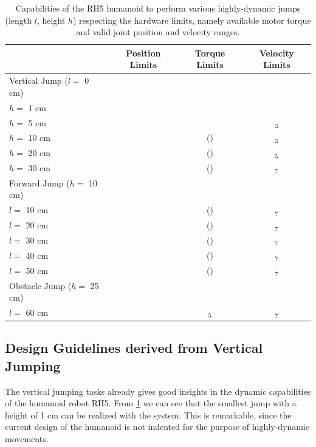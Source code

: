 \begin{table}[t]
\centering
\caption{Capabilities of the RH5 humanoid to perform various highly-dynamic jumps (length $l$, height $h$) respecting the hardware limits, namely available motor torque and valid joint position and velocity ranges.}
\begin{tabular}{lccc}
\hline
& Position Limits & Torque Limits & Velocity Limits\\ \hline
Vertical Jump ($l=$ 0 cm) & & & \\
\quad\quad $h=$ 1 cm 		& \greencheckmark  & \greencheckmark & \greencheckmark \\
\quad\quad $h=$ 5 cm 		& \greencheckmark  & \greencheckmark & \redxmark$_3$ \\
\quad\quad $h=$ 10 cm 		& \greencheckmark & (\greencheckmark) & \redxmark$_3$  \\
\quad\quad $h=$ 20 cm 		& \greencheckmark  & (\greencheckmark) & \redxmark$_5$ \\
\quad\quad $h=$ 30 cm 		& \greencheckmark  & (\greencheckmark) & \redxmark$_7$ \\ \hline
Forward Jump ($h=$ 10 cm)& & & \\
\quad\quad $l=$ 10 cm 		& \greencheckmark  & (\greencheckmark) & \redxmark$_7$ \\
\quad\quad $l=$ 20 cm 		& \greencheckmark  & (\greencheckmark) & \redxmark$_7$ \\
\quad\quad $l=$ 30 cm 		& \greencheckmark  & (\greencheckmark) & \redxmark$_7$ \\
\quad\quad $l=$ 40 cm 		& \greencheckmark  & (\greencheckmark) & \redxmark$_7$ \\
\quad\quad $l=$ 50 cm 		& \greencheckmark  & (\greencheckmark) & \redxmark$_7$ \\ \hline
Obstacle Jump ($h=$ 25 cm)& & & \\
\quad\quad $l=$ 60 cm 		& \greencheckmark  & \redxmark$_5$ & \redxmark$_7$ \\ \hline
\end{tabular}
\label{tab:systemLimits}
\end{table}

\subsection{Design Guidelines derived from Vertical Jumping}
The vertical jumping tasks already gives good insights in the dynamic capabilities of the humanoid robot RH5. From \cref{tab:systemLimits} we can see that the smallest jump with a height of 1 cm can be realized with the system. This is remarkable, since the current design of the humanoid is not indented for the purpose of highly-dynamic movements. 

